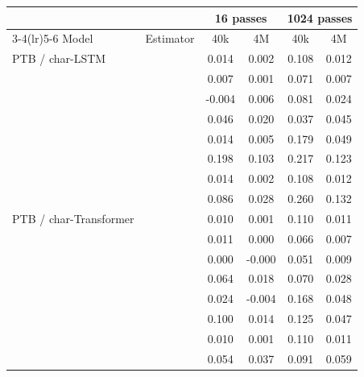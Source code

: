 \begin{tabular}{l l cc cc}
\toprule
 & & \multicolumn{2}{c}{16 passes} & \multicolumn{2}{c}{1024 passes} \\
\cmidrule(lr){3-4}\cmidrule(lr){5-6}
Model & Estimator & 40k & 4M & 40k & 4M \\
\midrule
PTB / char-LSTM & \SPSA{} & 0.014 & 0.002 & 0.108 & 0.012 \\
 & \RS{} & 0.007 & 0.001 & 0.071 & 0.007 \\
 & \NP{} & -0.004 & 0.006 & 0.081 & 0.024 \\
 & \ANP{} & 0.046 & 0.020 & 0.037 & 0.045 \\
 & \INP{} & 0.014 & 0.005 & 0.179 & 0.049 \\
 & \DANP{} & 0.198 & 0.103 & 0.217 & 0.123 \\
 & \SPSAb{} & 0.014 & 0.002 & 0.108 & 0.012 \\
 & \ANPb{} & 0.086 & 0.028 & 0.260 & 0.132 \\
\midrule
PTB / char-Transformer & \SPSA{} & 0.010 & 0.001 & 0.110 & 0.011 \\
 & \RS{} & 0.011 & 0.000 & 0.066 & 0.007 \\
 & \NP{} & 0.000 & -0.000 & 0.051 & 0.009 \\
 & \ANP{} & 0.064 & 0.018 & 0.070 & 0.028 \\
 & \INP{} & 0.024 & -0.004 & 0.168 & 0.048 \\
 & \DANP{} & 0.100 & 0.014 & 0.125 & 0.047 \\
 & \SPSAb{} & 0.010 & 0.001 & 0.110 & 0.011 \\
 & \ANPb{} & 0.054 & 0.037 & 0.091 & 0.059 \\
\bottomrule
\end{tabular}
